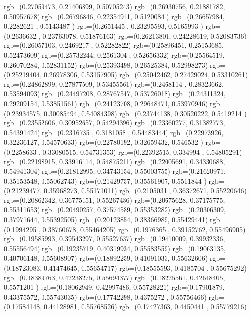 {{{		  rgb=(0.27059473,  0.21406899,  0.50705243)
		  rgb=(0.26930756,  0.21881782,  0.50957678)
		  rgb=(0.26796846,  0.22354911,  0.5120084 )
		  rgb=(0.26657984,  0.2282621 ,  0.5143487 )
		  rgb=(0.2651445 ,  0.23295593,  0.5165993 )
		  rgb=(0.2636632 ,  0.23763078,  0.51876163)
		  rgb=(0.26213801,  0.24228619,  0.52083736)
		  rgb=(0.26057103,  0.2469217 ,  0.52282822)
		  rgb=(0.25896451,  0.25153685,  0.52473609)
		  rgb=(0.25732244,  0.2561304 ,  0.52656332)
		  rgb=(0.25564519,  0.26070284,  0.52831152)
		  rgb=(0.25393498,  0.26525384,  0.52998273)
		  rgb=(0.25219404,  0.26978306,  0.53157905)
		  rgb=(0.25042462,  0.27429024,  0.53310261)
		  rgb=(0.24862899,  0.27877509,  0.53455561)
		  rgb=(0.2468114 ,  0.28323662,  0.53594093)
		  rgb=(0.24497208,  0.28767547,  0.53726018)
		  rgb=(0.24311324,  0.29209154,  0.53851561)
		  rgb=(0.24123708,  0.29648471,  0.53970946)
		  rgb=(0.23934575,  0.30085494,  0.54084398)
		  rgb=(0.23744138,  0.30520222,  0.5419214 )
		  rgb=(0.23552606,  0.30952657,  0.54294396)
		  rgb=(0.23360277,  0.31382773,  0.54391424)
		  rgb=(0.2316735 ,  0.3181058 ,  0.54483444)
		  rgb=(0.22973926,  0.32236127,  0.54570633)
		  rgb=(0.22780192,  0.32659432,  0.546532  )
		  rgb=(0.2258633 ,  0.33080515,  0.54731353)
		  rgb=(0.22392515,  0.334994  ,  0.54805291)
		  rgb=(0.22198915,  0.33916114,  0.54875211)
		  rgb=(0.22005691,  0.34330688,  0.54941304)
		  rgb=(0.21812995,  0.34743154,  0.55003755)
		  rgb=(0.21620971,  0.35153548,  0.55062743)
		  rgb=(0.21429757,  0.35561907,  0.5511844 )
		  rgb=(0.21239477,  0.35968273,  0.55171011)
		  rgb=(0.2105031 ,  0.36372671,  0.55220646)
		  rgb=(0.20862342,  0.36775151,  0.55267486)
		  rgb=(0.20675628,  0.37175775,  0.55311653)
		  rgb=(0.20490257,  0.37574589,  0.55353282)
		  rgb=(0.20306309,  0.37971644,  0.55392505)
		  rgb=(0.20123854,  0.38366989,  0.55429441)
		  rgb=(0.1994295 ,  0.38760678,  0.55464205)
		  rgb=(0.1976365 ,  0.39152762,  0.55496905)
		  rgb=(0.19585993,  0.39543297,  0.55527637)
		  rgb=(0.19410009,  0.39932336,  0.55556494)
		  rgb=(0.19235719,  0.40319934,  0.55583559)
		  rgb=(0.19063135,  0.40706148,  0.55608907)
		  rgb=(0.18892259,  0.41091033,  0.55632606)
		  rgb=(0.18723083,  0.41474645,  0.55654717)
		  rgb=(0.18555593,  0.4185704 ,  0.55675292)
		  rgb=(0.18389763,  0.42238275,  0.55694377)
		  rgb=(0.18225561,  0.42618405,  0.5571201 )
		  rgb=(0.18062949,  0.42997486,  0.55728221)
		  rgb=(0.17901879,  0.43375572,  0.55743035)
		  rgb=(0.17742298,  0.4375272 ,  0.55756466)
		  rgb=(0.17584148,  0.44128981,  0.55768526)
		  rgb=(0.17427363,  0.4450441 ,  0.55779216)
}}}
